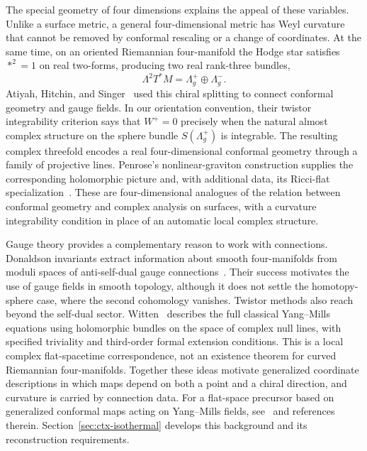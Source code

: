 \documentclass[11pt]{article}
\numberwithin{equation}{section}
\theoremstyle{definition}
\theoremstyle{remark}
\begin{document}
The special geometry of four dimensions explains the appeal of these
variables. Unlike a surface metric, a general four-dimensional metric has
Weyl curvature that cannot be removed by conformal rescaling or a change
of coordinates. At the same time, on an oriented Riemannian four-manifold
the Hodge star satisfies \(*^2=1\) on real two-forms, producing two real
rank-three bundles,
\[
 \Lambda^2T^*M=\Lambda_g^+\oplus\Lambda_g^-.
\]
Atiyah, Hitchin, and Singer~\cite{AHS1978} used this chiral splitting to
connect conformal geometry and gauge fields. In our orientation convention,
their twistor integrability criterion says that \(W^+=0\) precisely when
the natural almost complex
structure on the sphere bundle \(S(\Lambda_g^+)\) is integrable.
The resulting complex threefold encodes a real four-dimensional conformal
geometry through a family of projective lines. Penrose's nonlinear-graviton
construction supplies the corresponding
holomorphic picture and, with additional data, its Ricci-flat
specialization~\cite{Penrose1976}. These are four-dimensional analogues of
the relation between conformal geometry and complex analysis on surfaces,
with a curvature integrability condition in place of an automatic local
complex structure.

Gauge theory provides a complementary reason to work with connections.
Donaldson invariants extract information about smooth four-manifolds from
moduli spaces of anti-self-dual gauge connections~\cite{DonaldsonKronheimer1990}.
Their success motivates the use of gauge fields in smooth topology,
although it does not settle the
homotopy-sphere case, where the second cohomology vanishes. Twistor methods
also reach beyond the self-dual sector. Witten~\cite{Witten1978} describes
the full classical Yang--Mills equations using holomorphic bundles on the
space of complex null lines, with specified triviality and third-order
formal extension conditions. This is a local
complex flat-spacetime correspondence, not an existence theorem for curved
Riemannian four-manifolds. Together these ideas motivate generalized
coordinate descriptions in which maps depend on both a point and a chiral
direction, and curvature is carried by connection data. For a flat-space
precursor based on generalized conformal maps acting on Yang--Mills fields,
see~\cite{Baker2023} and references therein.
Section~\ref{sec:ctx-isothermal} develops this background and its
reconstruction requirements.
\end{document}
